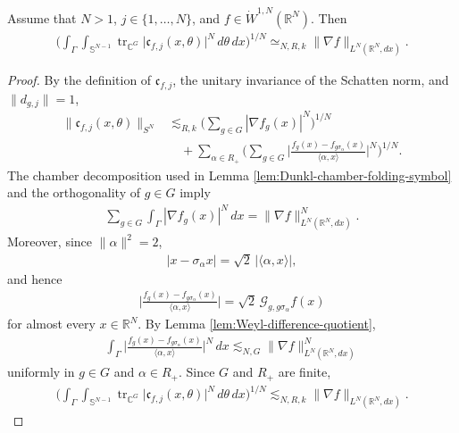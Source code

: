 \documentclass{amsart}
\begin{document}
\begin{lemma}\label{lem:Dunkl-spectral-density-Sobolev}
Assume that \(N>1\), \(j\in\{1,\ldots,N\}\), and \(f\in\dot W^{1,N}(\mathbb R^N)\). Then
\begin{align*}
\Bigg(
\int_{\Gamma}
\int_{\mathbb S^{N-1}}
\operatorname{tr}_{\mathbb C^G}
\big|
\mathfrak c_{f,j}(x,\theta)
\big|^N
\,d\theta\,dx
\Bigg)^{1/N}
\simeq_{N,R,k}
\|\nabla f\|_{L^N(\mathbb R^N,dx)}.
\end{align*}
\end{lemma}
\begin{proof}
By the definition of \(\mathfrak c_{f,j}\), the unitary invariance of
the Schatten norm, and \(\|d_{g,j}\|=1\),
\begin{align*}
\|\mathfrak c_{f,j}(x,\theta)\|_{S^N}
&\lesssim_{R,k}
\Bigg(
\sum_{g\in G}
|\nabla f_g(x)|^N
\Bigg)^{1/N}\\
&\quad+
\sum_{\alpha\in R_+}
\Bigg(
\sum_{g\in G}
\bigg|
\frac{f_g(x)-f_{g\sigma_\alpha}(x)}
{\langle\alpha,x\rangle}
\bigg|^N
\Bigg)^{1/N}.
\end{align*}
The chamber decomposition used in Lemma
\ref{lem:Dunkl-chamber-folding-symbol} and the orthogonality of
\(g\in G\) imply
\begin{align*}
\sum_{g\in G}
\int_\Gamma
|\nabla f_g(x)|^N\,dx
=
\|\nabla f\|_{L^N(\mathbb R^N,dx)}^N.
\end{align*}
Moreover, since \(\|\alpha\|^2=2\),
\begin{align*}
|x-\sigma_\alpha x|
=
\sqrt{2}\,|\langle\alpha,x\rangle|,
\end{align*}
and hence
\begin{align*}
\bigg|
\frac{f_g(x)-f_{g\sigma_\alpha}(x)}
{\langle\alpha,x\rangle}
\bigg|
=
\sqrt{2}\,
\mathcal G_{g,g\sigma_\alpha}f(x)
\end{align*}
for almost every \(x\in\mathbb R^N\). By Lemma
\ref{lem:Weyl-difference-quotient},
\begin{align*}
\int_\Gamma
\bigg|
\frac{f_g(x)-f_{g\sigma_\alpha}(x)}
{\langle\alpha,x\rangle}
\bigg|^N
\,dx
\lesssim_{N,G}
\|\nabla f\|_{L^N(\mathbb R^N,dx)}^N
\end{align*}
uniformly in \(g\in G\) and \(\alpha\in R_+\). Since \(G\) and
\(R_+\) are finite,
\begin{align}
\Bigg(
\int_\Gamma
\int_{\mathbb S^{N-1}}
\operatorname{tr}_{\mathbb C^G}
\big|
\mathfrak c_{f,j}(x,\theta)
\big|^N
\,d\theta\,dx
\Bigg)^{1/N}
\lesssim_{N,R,k}
\|\nabla f\|_{L^N(\mathbb R^N,dx)}.
\label{eq:Dunkl-spectral-density-upper}
\end{align}


\end{proof}
\end{document}
